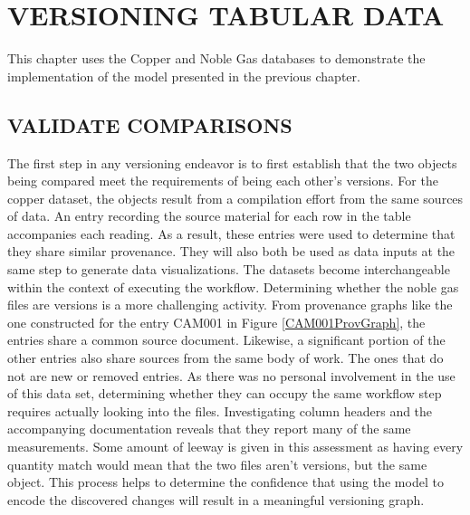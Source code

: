 
\chapter{VERSIONING TABULAR DATA}\label{ch:spreadsheet}

This chapter uses the Copper and Noble Gas databases to demonstrate the implementation of the model presented in the previous chapter.

\section{VALIDATE COMPARISONS}

The first step in any versioning endeavor is to first establish that the two objects being compared meet the requirements of being each other's versions.
For the copper dataset, the objects result from a compilation effort from the same sources of data.
An entry recording the source material for each row in the table accompanies each reading.
As a result, these entries were used to determine that they share similar provenance.
They will also both be used as data inputs at the same step to generate data visualizations.
The datasets become interchangeable within the context of executing the workflow.
Determining whether the noble gas files are versions is a more challenging activity.
From provenance graphs like the one constructed for the entry CAM001 in Figure \ref{CAM001ProvGraph}, the entries share a common source document.
Likewise, a significant portion of the other entries also share sources from the same body of work.
The ones that do not are new or removed entries.
As there was no personal involvement in the use of this data set, determining whether they can occupy the same workflow step requires actually looking into the files.
Investigating column headers and the accompanying documentation reveals that they report many of the same measurements.
Some amount of leeway is given in this assessment as having every quantity match would mean that the two files aren't versions, but the same object.
This process helps to determine the confidence that using the model to encode the discovered changes will result in a meaningful versioning graph.

